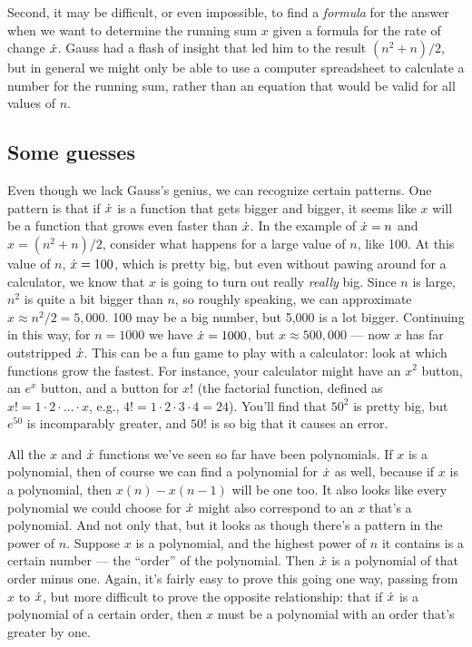 Second, it may be difficult, or even impossible, to find
a \emph{formula} for the answer when we want to determine
the running sum $x$ given a formula for the rate of change
$\dot{x}$. Gauss had a flash of insight that led him to
the result $(n^2+n)/2$, but in general we might only be
able to use a computer spreadsheet to calculate a number
for the running sum, rather than an
equation that would be valid for all values of $n$.
%
\subsection{Some guesses}
%
Even though we lack Gauss's genius, we can recognize
certain patterns. One pattern is that if $\dot{x}$ is
a function that gets bigger and bigger, it seems like
$x$ will be a function that grows even faster than $\dot{x}$.
In the example of $\dot{x}=n$ and $x=(n^2+n)/2$, consider
what happens for a large value of $n$, like 100. At this value of $n$,
$\dot{x}=100$, which is pretty big, but even without pawing around for
a calculator, we know that $x$ is going to turn out really \emph{really} big. Since $n$ is
large, $n^2$ is quite a bit bigger than $n$, so roughly speaking,
we can approximate $x\approx n^2/2=5,000$. 100 may be a big number,
but 5,000 is a lot bigger. Continuing in this way, for $n=1000$ we
have $\dot{x}=1000$, but $x\approx 500,000$ --- now $x$ has far
outstripped $\dot{x}$. This can be a fun game to play with a calculator:
look at which functions grow the fastest. For instance, your calculator
might have an $x^2$ button, an $e^x$ button, and a button for $x!$ (the
factorial function, defined
as $x!=1\cdot 2\cdot\ldots\cdot x$, e.g., $4!=1 \cdot 2 \cdot 3 \cdot 4=24$). You'll find
that $50^2$ is pretty big, but $e^{50}$ is incomparably greater, and $50!$
is so big that it causes an error.

All the $x$ and $\dot{x}$ functions we've
seen so far have been polynomials. If $x$ is a polynomial,
then of course we can find a polynomial for $\dot{x}$ as well,
because if $x$ is a polynomial, then $x(n)-x(n-1)$ will be one too.
It also looks like every polynomial we could choose
for $\dot{x}$ might also correspond to an $x$ that's a polynomial.
And not only that, but it looks as though there's a pattern in the
power of $n$. Suppose $x$ is a polynomial, and the highest power of $n$ it contains is
a certain number --- the ``order'' of the polynomial. Then $\dot{x}$ is a polynomial
of that order minus one. Again, it's fairly easy to prove this going one
way, passing from $x$ to $\dot{x}$, but more difficult to prove the opposite
relationship: that if $\dot{x}$ is a polynomial of a certain order, then
$x$ must be a polynomial with an order that's greater by one.

